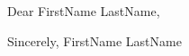 \documentclass{letter} %
\begin{document}
Dear FirstName LastName, %

\bigbreak %

\blindtext %

\blindtext %

\bigbreak %
Sincerely,
\bigbreak %
FirstName LastName %
\end{document}
